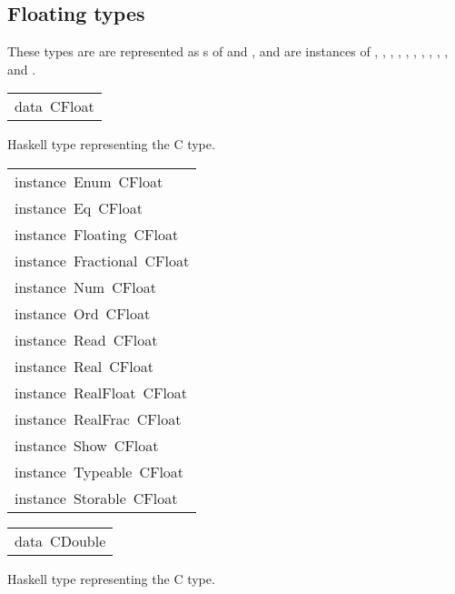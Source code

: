 \subsection{Floating types
}
These types are are represented as s of
  and , and are instances of
 , , , ,
 , , ,
 , , ,
  and .
\par

\begin{haddockdesc}
\item[\begin{tabular}{@{}l}
data\ CFloat
\end{tabular}]\haddockbegindoc
Haskell type representing the C  type.
\par

\end{haddockdesc}
\begin{haddockdesc}
\item[\begin{tabular}{@{}l}
instance\ Enum\ CFloat\\instance\ Eq\ CFloat\\instance\ Floating\ CFloat\\instance\ Fractional\ CFloat\\instance\ Num\ CFloat\\instance\ Ord\ CFloat\\instance\ Read\ CFloat\\instance\ Real\ CFloat\\instance\ RealFloat\ CFloat\\instance\ RealFrac\ CFloat\\instance\ Show\ CFloat\\instance\ Typeable\ CFloat\\instance\ Storable\ CFloat
\end{tabular}]
\end{haddockdesc}
\begin{haddockdesc}
\item[\begin{tabular}{@{}l}
data\ CDouble
\end{tabular}]\haddockbegindoc
Haskell type representing the C  type.
\par

\end{haddockdesc}
